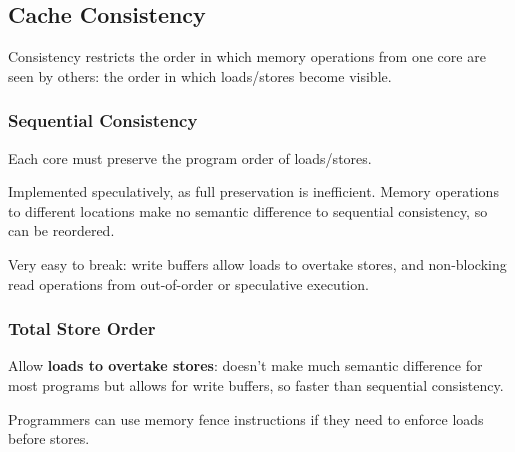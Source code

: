 \documentclass[a4paper, 11pt]{article}
\begin{document}
{    \subsection*{Cache Consistency}
    {
        Consistency restricts the order in which memory operations from one core are seen by others: the order in which loads/stores become visible.

        \subsubsection*{Sequential Consistency}
        {
            Each core must preserve the program order of loads/stores.

            Implemented speculatively, as full preservation is inefficient. Memory operations to different locations make no semantic difference to sequential consistency, so can be reordered.

            Very easy to break: write buffers allow loads to overtake stores, and non-blocking read operations from out-of-order or speculative execution.
        }
        \subsubsection*{Total Store Order}
        {
            Allow \textbf{loads to overtake stores}: doesn't make much semantic difference for most programs but allows for write buffers, so faster than sequential consistency.

            Programmers can use memory fence instructions if they need to enforce loads before stores.
        }
    }
}
\end{document}
